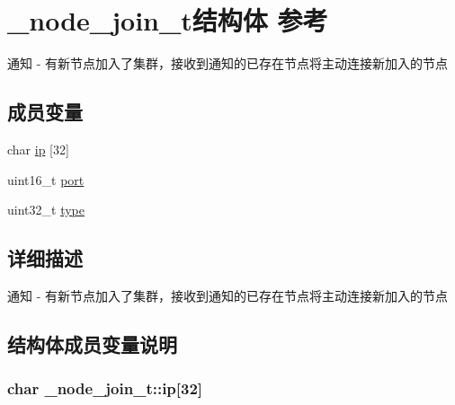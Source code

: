 \hypertarget{a00036}{}\section{\+\_\+node\+\_\+join\+\_\+t结构体 参考}
\label{a00036}


通知 -\/ 有新节点加入了集群，接收到通知的已存在节点将主动连接新加入的节点  


\subsection*{成员变量}
\begin{DoxyCompactItemize}
\item 
char \hyperlink{a00036_a529a980ae4378baacedbda7996e28c42_a529a980ae4378baacedbda7996e28c42}{ip} \mbox{[}32\mbox{]}
\item 
uint16\+\_\+t \hyperlink{a00036_a1654e0e0747e2b7eac3710a655edb7a2_a1654e0e0747e2b7eac3710a655edb7a2}{port}
\item 
uint32\+\_\+t \hyperlink{a00036_a62ba1229e457a867a69781489a0d654e_a62ba1229e457a867a69781489a0d654e}{type}
\end{DoxyCompactItemize}


\subsection{详细描述}
通知 -\/ 有新节点加入了集群，接收到通知的已存在节点将主动连接新加入的节点 

\subsection{结构体成员变量说明}
\hypertarget{a00036_a529a980ae4378baacedbda7996e28c42_a529a980ae4378baacedbda7996e28c42}{}
\subsubsection[{ip}]{\setlength{\rightskip}{0pt plus 5cm}char \+\_\+node\+\_\+join\+\_\+t\+::ip\mbox{[}32\mbox{]}}\label{a00036_a529a980ae4378baacedbda7996e28c42_a529a980ae4378baacedbda7996e28c42}
\hypertarget{a00036_a1654e0e0747e2b7eac3710a655edb7a2_a1654e0e0747e2b7eac3710a655edb7a2}{}

